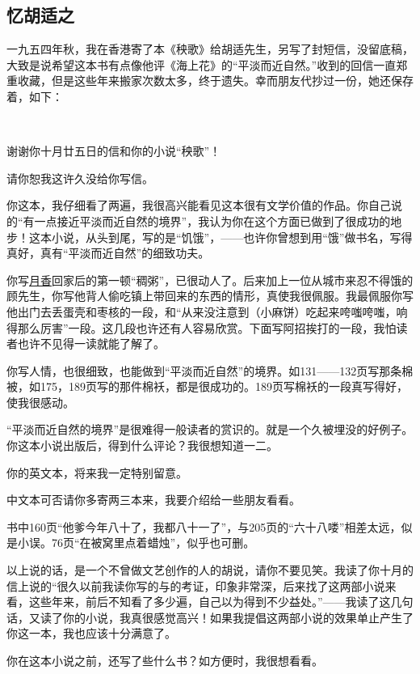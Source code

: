 \subsection{忆胡适之}


\par 一九五四年秋，我在香港寄了本《秧歌》给胡适先生，另写了封短信，没留底稿，大致是说希望这本书有点像他评《海上花》的“平淡而近自然。”收到的回信一直郑重收藏，但是这些年来搬家次数太多，终于遗失。幸而朋友代抄过一份，她还保存着，如下：
\par  
\par {}
\par 谢谢你十月廿五日的信和你的小说“秧歌”！
\par 请你恕我这许久没给你写信。
\par 你这本，我仔细看了两遍，我很高兴能看见这本很有文学价值的作品。你自己说的“有一点接近平淡而近自然的境界”，我认为你在这个方面已做到了很成功的地步！这本小说，从头到尾，写的是“饥饿”，——也许你曾想到用“饿”做书名，写得真好，真有“平淡而近自然”的细致功夫。
\par 你写\uline{月香}回家后的第一顿“稠粥”，已很动人了。后来加上一位从城市来忍不得饿的顾先生，你写他背人偷吃镇上带回来的东西的情形，真使我很佩服。我最佩服你写他出门去丢蛋壳和枣核的一段，和“从来没注意到（小麻饼）吃起来咵嗤咵嗤，响得那么厉害”一段。这几段也许还有人容易欣赏。下面写阿招挨打的一段，我怕读者也许不见得一读就能了解了。
\par 你写人情，也很细致，也能做到“平淡而近自然”的境界。如131——132页写那条棉被，如175，189页写的那件棉袄，都是很成功的。189页写棉袄的一段真写得好，使我很感动。
\par “平淡而近自然的境界”是很难得一般读者的赏识的。就是一个久被埋没的好例子。你这本小说出版后，得到什么评论？我很想知道一二。
\par 你的英文本，将来我一定特别留意。
\par 中文本可否请你多寄两三本来，我要介绍给一些朋友看看。
\par 书中160页“他爹今年八十了，我都八十一了”，与205页的“六十八喽”相差太远，似是小误。76页“在被窝里点着蜡烛”，似乎也可删。
\par 以上说的话，是一个不曾做文艺创作的人的胡说，请你不要见笑。我读了你十月的信上说的“很久以前我读你写的与的考证，印象非常深，后来找了这两部小说来看，这些年来，前后不知看了多少遍，自己以为得到不少益处。”——我读了这几句话，又读了你的小说，我真很感觉高兴！如果我提倡这两部小说的效果单止产生了你这一本，我也应该十分满意了。
\par 你在这本小说之前，还写了些什么书？如方便时，我很想看看。
